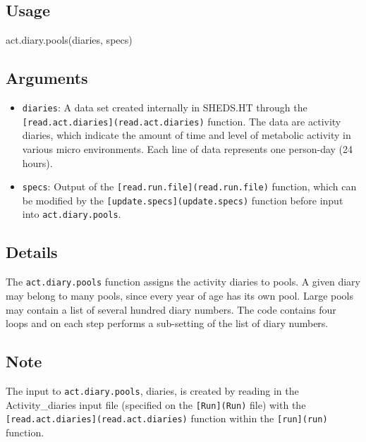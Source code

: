 \documentclass[
]{article}
\newenvironment{Shaded}{\begin{snugshade}}{\end{snugshade}}
\newcommand{\FunctionTok}[1]{\textcolor[rgb]{0.00,0.00,0.00}{#1}}
\newcommand{\NormalTok}[1]{#1}
\providecommand{\tightlist}{%
  \setlength{\itemsep}{0pt}\setlength{\parskip}{0pt}}
\begin{document}
\hypertarget{usage}{%
\subsection{Usage}\label{usage}}

\begin{Shaded}
\begin{Highlighting}[]
\FunctionTok{act.diary.pools}\NormalTok{(diaries, specs)}
\end{Highlighting}
\end{Shaded}

\hypertarget{arguments}{%
\subsection{Arguments}\label{arguments}}

\begin{itemize}
\tightlist
\item
  \texttt{diaries}: A data set created internally in SHEDS.HT through
  the \texttt{{[}read.act.diaries{]}(read.act.diaries)} function. The
  data are activity diaries, which indicate the amount of time and level
  of metabolic activity in various micro environments. Each line of data
  represents one person-day (24 hours).
\item
  \texttt{specs}: Output of the
  \texttt{{[}read.run.file{]}(read.run.file)} function, which can be
  modified by the \texttt{{[}update.specs{]}(update.specs)} function
  before input into \texttt{act.diary.pools}.
\end{itemize}

\hypertarget{details}{%
\subsection{Details}\label{details}}

The \texttt{act.diary.pools} function assigns the activity diaries to
pools. A given diary may belong to many pools, since every year of age
has its own pool. Large pools may contain a list of several hundred
diary numbers. The code contains four loops and on each step performs a
sub-setting of the list of diary numbers.

\hypertarget{note}{%
\subsection{Note}\label{note}}

The input to \texttt{act.diary.pools}, diaries, is created by reading in
the Activity\_diaries input file (specified on the
\texttt{{[}Run{]}(Run)} file) with the
\texttt{{[}read.act.diaries{]}(read.act.diaries)} function within the
\texttt{{[}run{]}(run)} function.
\end{document}

